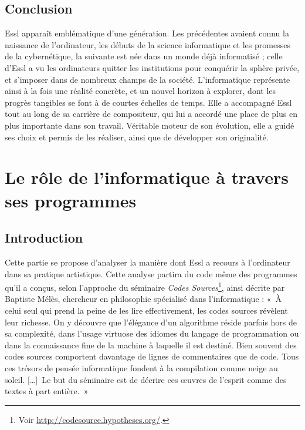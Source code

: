 \documentclass[a4paper,12pt]{article}
\newcommand{\guill}[1]{«~#1~»}
\newcommand{\zitat}[2]{\#Citation(#2)\#}
\newcommand{\tpp}[0]{[\dots]}
\begin{document}
\subsection{Conclusion}

Essl apparaît emblématique d'une génération. Les précédentes avaient connu la naissance de l'ordinateur, les débuts de la science informatique et les promesses de la cybernétique, la suivante est née dans un monde déjà informatisé ; celle d'Essl a vu les ordinateurs quitter les institutions pour conquérir la sphère privée, et s'imposer dans de nombreux champs de la société. L'informatique représente ainsi à la fois une réalité concrète, et un nouvel horizon à explorer, dont les progrès tangibles se font à de courtes échelles de temps. Elle a accompagné Essl tout au long de sa carrière de compositeur, qui lui a accordé une place de plus en plus importante dans son travail. Véritable moteur de son évolution, elle a guidé ses choix et permis de les réaliser, ainsi que de développer son originalité.




\section{Le rôle de l'informatique à travers ses programmes}

\subsection{Introduction}

Cette partie se propose d'analyser la manière dont Essl a recours à l'ordinateur dans sa pratique artistique. Cette analyse partira du code même des programmes qu'il a conçus, selon l'approche du séminaire \emph{Codes Sources}\footnote{Voir \href{http://codesource.hypotheses.org/}{http://codesource.hypotheses.org/}.}, ainsi décrite par Baptiste Mélès, chercheur en philosophie spécialisé dans l'informatique : \guill{À celui seul qui prend la peine de les lire effectivement, les codes sources révèlent leur richesse. On y découvre que l’élégance d’un algorithme réside parfois hors de sa complexité, dans l’usage virtuose des idiomes du langage de programmation ou dans la connaissance fine de la machine à laquelle il est destiné. Bien souvent des codes sources comportent davantage de lignes de commentaires que de code. Tous ces trésors de pensée informatique fondent à la compilation comme neige au soleil. \tpp~Le but du séminaire est de décrire ces œuvres de l’esprit comme des textes à part entière.}
\end{document}
